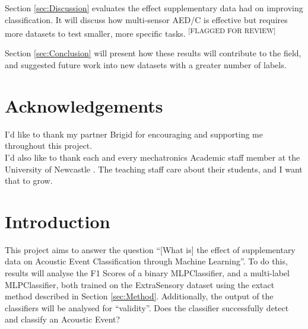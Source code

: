 \documentclass{UoNMCHA}
\newcommand{\flagforreview}{\textsuperscript{\color{red} [FLAGGED FOR REVIEW]}}
\newcommand{\inlineQuote}[1]{``#1''}
\numberwithin{equation}{section}
\begin{document}
Section \ref{sec:Discussion} evaluates the effect supplementary data had on improving classification. It will discuss how multi-sensor AED/C is effective but requires more datasets to test smaller, more specific tasks. \flagforreview

Section \ref{sec:Conclusion} will present how these results will contribute to the field, and suggested future work into new datasets with a greater number of labels.
\newpage
\vspace{-2mm}
\section*{Acknowledgements}
\vspace{-3mm}
I'd like to thank my partner Brigid for encouraging and supporting me throughout this project. \\

I'd also like to thank each and every mechatronics Academic staff member at the University of Newcastle . The teaching staff care about their students, and I want that to grow.
\newpage
\tableofcontents
\newpage
\section{Introduction}
This project aims to answer the question \inlineQuote{[What is] the effect of supplementary data on Acoustic Event Classification through Machine Learning}. To do this, results will analyse the F1 Scores of a binary MLPClassifier, and a multi-label MLPClassifier, both trained on the ExtraSensory dataset using the extact method described in Section \ref{sec:Method}.
Additionally, the output of the classifiers will be analysed for \inlineQuote{validity}. Does the classifier successfully detect and classify an Acoustic Event?
\end{document}
